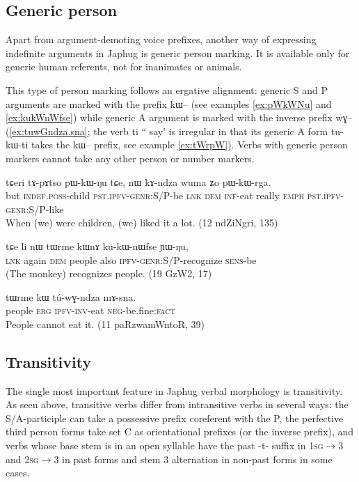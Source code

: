 \documentclass[oldfontcommands,oneside,a4paper,11pt]{article}
\newcommand{\ipa}[1]{{\phon#1}} %
\newcommand{\factual}[1]{\textsc{:fact}}
\begin{document}
\subsection{Generic person} \label{sec:generic}
Apart from argument-demoting voice prefixes, another way of expressing indefinite arguments in Japhug is generic person marking. It is available only for generic human referents, not for inanimates or animals.

This type of person marking follows an ergative alignment: generic S and P arguments are marked with the prefix \ipa{kɯ--} (see examples \ref{ex:pWkWNu} and \ref{ex:kukWnWfse}) while generic A argument is marked with the inverse prefix \ipa{wɣ--} (\ref{ex:tuwGndza.sna}; the verb \ipa{ti} `` say' is irregular in that its generic A form \ipa{tu-kɯ-ti} takes the \ipa{kɯ--} prefix, see example \ref{ex:tWrpW}).  Verbs with generic person markers cannot take any other person or number markers.


\begin{exe}
\ex \label{ex:pWkWNu}
\gll
\ipa{tɕeri} 	\ipa{tɤ-pɤtso} 	\ipa{pɯ-kɯ-ŋu} 	\ipa{tɕe,} 	\ipa{nɯ} 	\ipa{kɤ-ndza} 	\ipa{wuma} 	\ipa{ʑo} 	\ipa{pɯ-kɯ-rga.} \\
but \textsc{indef.poss-}child \textsc{pst.ipfv-genr}:S/P-be \textsc{lnk} \textsc{dem} \textsc{inf}-eat really \textsc{emph} \textsc{pst.ipfv-genr}:S/P-like \\
\glt When (we) were children, (we) liked it a lot. (12 ndZiNgri, 135)
\end{exe}


\begin{exe}
\ex \label{ex:kukWnWfse}
\gll
\ipa{tɕe}  	\ipa{li}  	\ipa{nɯ}  	\ipa{tɯrme}  	\ipa{kɯnɤ}  	\ipa{ku-kɯ-nɯfse}  	\ipa{ɲɯ-ŋu,}\\
\textsc{lnk} again \textsc{dem} people also \textsc{ipfv-genr:S/P}-recognize \textsc{sens}-be\\
\glt  (The monkey) recognizes people. (19 GzW2, 17)
\end{exe}

\begin{exe}
\ex \label{ex:tuwGndza.sna}
\gll
\ipa{tɯrme}  	\ipa{kɯ}  	\ipa{tú-wɣ-ndza}  	\ipa{mɤ-sna.}   \\
people \textsc{erg} \textsc{ipfv-inv}-eat \textsc{neg-}be.fine\factual{} \\
\glt People cannot eat it. (11 paRzwamWntoR, 39)
\end{exe}

\subsection{Transitivity}
The single most important feature in Japhug verbal morphology is transitivity. As seen above, transitive verbs differ from intransitive verbs in several ways: the S/A-participle can take a possessive prefix coreferent with the P, the perfective third person forms take set C as orientational prefixes (or the inverse prefix), and verbs whose base stem is in an open syllable have the past \ipa{-t-} suffix in \textsc{1sg$\rightarrow$3} and \textsc{2sg$\rightarrow$3} in past forms and stem 3 alternation in non-past forms in some cases.
\end{document}
